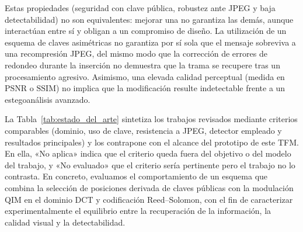 \documentclass[IB]{TFUOC}%
\begin{document}
Estas propiedades (seguridad con clave pública, robustez ante JPEG y baja detectabilidad) no son equivalentes: mejorar una no garantiza las demás, aunque interactúan entre sí y obligan a un compromiso de diseño. La utilización de un esquema de claves asimétricas no garantiza por sí sola que el mensaje sobreviva a una recompresión JPEG, del mismo modo que la corrección de errores de redondeo durante la inserción no demuestra que la trama se recupere tras un procesamiento agresivo. Asimismo, una elevada calidad perceptual (medida en $\mathrm{PSNR}$ o $\mathrm{SSIM}$) no implica que la modificación resulte indetectable frente a un estegoanálisis avanzado.

La Tabla~\ref{tab:estado_del_arte} sintetiza los trabajos revisados mediante criterios comparables (dominio, uso de clave, resistencia a JPEG, detector empleado y resultados principales) y los contrapone con el alcance del prototipo de este TFM. En ella, «No aplica» indica que el criterio queda fuera del objetivo o del modelo del trabajo, y «No evaluado» que el criterio sería pertinente pero el trabajo no lo contrasta. En concreto, evaluamos el comportamiento de un esquema que combina la selección de posiciones derivada de claves públicas con la modulación $\mathrm{QIM}$ en el dominio $\mathrm{DCT}$ y codificación Reed--Solomon, con el fin de caracterizar experimentalmente el equilibrio entre la recuperación de la información, la calidad visual y la detectabilidad.
\end{document}
